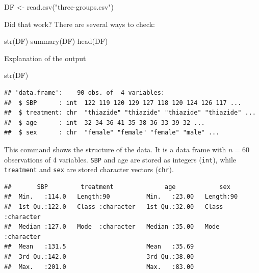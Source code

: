 \documentclass[
]{book}
\newenvironment{Shaded}{\begin{snugshade}}{\end{snugshade}}
\newcommand{\FunctionTok}[1]{\textcolor[rgb]{0.00,0.00,0.00}{#1}}
\newcommand{\NormalTok}[1]{#1}
\newcommand{\OtherTok}[1]{\textcolor[rgb]{0.56,0.35,0.01}{#1}}
\newcommand{\StringTok}[1]{\textcolor[rgb]{0.31,0.60,0.02}{#1}}
\begin{document}
\begin{Shaded}
\begin{Highlighting}[]
\NormalTok{DF }\OtherTok{\textless{}{-}} \FunctionTok{read.csv}\NormalTok{(}\StringTok{"three{-}groups.csv"}\NormalTok{)}
\end{Highlighting}
\end{Shaded}

Did that work? There are several ways to check:

\begin{Shaded}
\begin{Highlighting}[]
\FunctionTok{str}\NormalTok{(DF)}
\FunctionTok{summary}\NormalTok{(DF)}
\FunctionTok{head}\NormalTok{(DF)}
\end{Highlighting}
\end{Shaded}

Explanation of the output

\begin{Shaded}
\begin{Highlighting}[]
\FunctionTok{str}\NormalTok{(DF)}
\end{Highlighting}
\end{Shaded}

\begin{verbatim}
## 'data.frame':    90 obs. of  4 variables:
##  $ SBP      : int  122 119 120 129 127 118 120 124 126 117 ...
##  $ treatment: chr  "thiazide" "thiazide" "thiazide" "thiazide" ...
##  $ age      : int  32 34 36 41 35 38 36 33 39 32 ...
##  $ sex      : chr  "female" "female" "female" "male" ...
\end{verbatim}

This command shows the structure of the data. It is a data frame with \(n = 60\) observations of 4 variables. \texttt{SBP} and age are stored as integers (\texttt{int}), while \texttt{treatment} and \texttt{sex} are stored character vectors (\texttt{chr}).

\begin{verbatim}
##       SBP         treatment              age            sex           
##  Min.   :114.0   Length:90          Min.   :23.00   Length:90         
##  1st Qu.:122.0   Class :character   1st Qu.:32.00   Class :character  
##  Median :127.0   Mode  :character   Median :35.00   Mode  :character  
##  Mean   :131.5                      Mean   :35.69                     
##  3rd Qu.:142.0                      3rd Qu.:38.00                     
##  Max.   :201.0                      Max.   :83.00
\end{verbatim}
\end{document}
